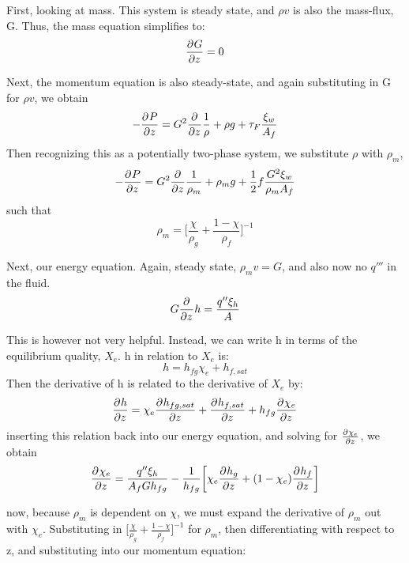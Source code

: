 \documentclass{article}
\begin{document}
First, looking at mass. This system is steady state, and $\rho v$ is also the mass-flux, G. Thus, the mass equation simplifies to:
\begin{equation}
    \frac{\partial^{}G}{\partial {z}^{}} = 0
\end{equation}

Next, the momentum equation is also steady-state, and again substituting in G for $\rho v$, we obtain
\begin{equation}
    -\frac{\partial^{}P}{\partial {z}^{}} = G^2\frac{\partial^{}}{\partial {z}^{}}\frac{1}{\rho} + \rho g + \tau_F\frac{\xi_w}{A_f}
\end{equation}
Then recognizing this as a potentially two-phase system, we substitute $\rho$ with $\rho_m$,
\begin{equation}
    -\frac{\partial^{}P}{\partial {z}^{}} = G^2\frac{\partial^{}}{\partial {z}^{}}\frac{1}{\rho_m} + \rho_m g + \frac{1}{2}f\frac{G^2\xi_w}{\rho_mA_f}
\end{equation}
such that
\begin{equation}
    \rho_m = \biggr[\frac{\chi}{\rho_g} + \frac{1-\chi}{\rho_f}\biggr]^{-1}
\end{equation}

Next, our energy equation. Again, steady state, $\rho_m v = G$, and also now no $q'''$ in the fluid.
\begin{equation}
    G\frac{\partial^{}}{\partial {z}^{}} h = \frac{q''\xi_h}{A}
\end{equation}

This is however not very helpful. Instead, we can write h in terms of the equilibrium quality, $X_e$. h in relation to $X_e$ is:
\begin{equation}
            h = h_{fg}\chi_e + h_{f,sat}
\end{equation}
Then the derivative of h is related to the derivative of $X_e$ by:
\begin{equation}
    \frac{\partial^{}h}{\partial {z}^{}} = \chi_e\frac{\partial^{}h_{fg,sat}}{\partial {z}^{}} + \frac{\partial^{}h_{f,sat}}{\partial {z}^{}} + h_{fg}\frac{\partial^{}\chi_e}{\partial {z}^{}}
\end{equation}
inserting this relation back into our energy equation, and solving for $\frac{\partial^{}\chi_e}{\partial {z}^{}}$, we obtain
\begin{equation}
    \frac{\partial^{}\chi_e}{\partial {z}^{}} = \frac{q''\xi_h}{A_fGh_{fg}} - \frac{1}{h_{fg}}\biggr[ \chi_e\frac{\partial^{}h_g}{\partial {z}^{}} + (1-\chi_e)\frac{\partial^{}h_f}{\partial {z}^{}}\biggr]
\end{equation}

now, because $\rho_m$ is dependent on $\chi$, we must expand the derivative of $\rho_m$ out with $\chi_e$. Substituting in $\biggr[\frac{\chi}{\rho_g} + \frac{1-\chi}{\rho_f}\biggr]^{-1}$ for $\rho_m$, then differentiating with respect to z, and substituting into our momentum equation:
\end{document}
